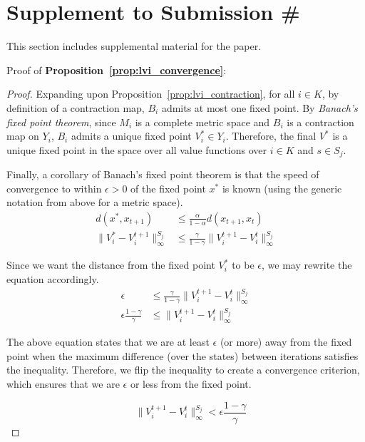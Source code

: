 \section*{Supplement to Submission \#}
\label{sec:supplement}

This section includes supplemental material for the paper.

Proof of {\bf Proposition~\ref{prop:lvi_convergence}}:
\begin{proof}
Expanding upon Proposition~\ref{prop:lvi_contraction}, for all $i \in K$, by definition of a contraction map, $B_i$ admits at most one fixed point. By \emph{Banach's fixed point theorem}, since $M_i$ is a complete metric space and $B_i$ is a contraction map on $Y_i$, $B_i$ admits a unique fixed point $V_i^* \in Y_i$. Therefore, the final $V^*$ is a unique fixed point in the space over all value functions over $i \in K$ and $s \in S_j$.

Finally, a corollary of Banach's fixed point theorem is that the speed of convergence to within $\epsilon > 0$ of the fixed point $x^*$ is known (using the generic notation from above for a metric space).
\begin{align*}
    d(x^*, x_{t+1}) &\leq \frac{\alpha}{1 - \alpha} d(x_{t+1}, x_t) \\
    \| V_i^* - V_i^{t+1}\|_\infty^{S_j} &\leq \frac{\gamma}{1 - \gamma} \| V_i^{t+1} - V_i^t \|_\infty^{S_j}
\end{align*}

Since we want the distance from the fixed point $V_i^*$ to be $\epsilon$, we may rewrite the equation accordingly.
\begin{align*}
    \epsilon &\leq \frac{\gamma}{1 - \gamma} \| V_i^{t+1} - V_i^t \|_\infty^{S_j} \\
    \epsilon \frac{1 - \gamma}{\gamma} &\leq \| V_i^{t+1} - V_i^t \|_\infty^{S_j}
\end{align*}

The above equation states that we are at least $\epsilon$ (or more) away from the fixed point when the maximum difference (over the states) between iterations satisfies the inequality. Therefore, we flip the inequality to create a convergence criterion, which ensures that we are $\epsilon$ or less from the fixed point.

\begin{equation*}
    \quad \| V_i^{t+1} - V_i^t \|_\infty^{S_j} < \epsilon \frac{1 - \gamma}{\gamma}
\end{equation*}
\end{proof}


